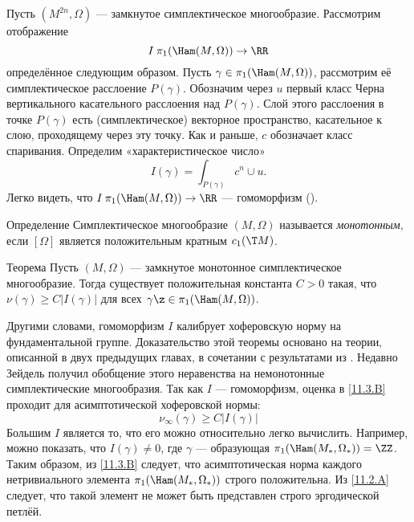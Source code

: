 Пусть $(M^{2n},\Omega)$ --- замкнутое симплектическое многообразие.
Рассмотрим отображение
\[I\:\pi_1(\Ham(M,\Omega))\to\RR\]
определённое следующим образом.
Пусть $\gamma\in\pi_1(\Ham(M,\Omega))$,
рассмотрим её симплектическое расслоение $P(\gamma)$.
Обозначим через $u$ первый класс Черна вертикального касательного расслоения над $P(\gamma)$.
Слой этого расслоения в точке $P(\gamma)$ есть (симплектическое) векторное пространство, касательное к слою, проходящему через эту точку.
Как и раньше, $c$ обозначает класс спаривания.
Определим «характеристическое число» 
\[I(\gamma)= \int_{P(\gamma)} c^n\cup u.\]
Легко видеть, что $I\: \pi_1(\Ham(M, \Omega))\to \RR$ --- гомоморфизм (\cite{P6,LMP2}).

\begin{ex}{Определение}\label{11.3.A} Симплектическое многообразие $(M,\Omega)$ называется \emph{монотонным}, если $[\Omega]$ является положительным кратным $c_1 (\T M)$.
\end{ex}

\begin{thm}[(\cite{P6})]{Теорема}\label{11.3.B}
Пусть $(M, \Omega)$ --- замкнутое монотонное симплектическое многообразие.
Тогда существует положительная константа $C>0$ такая, что
$\nu(\gamma)\ge C|I(\gamma)|$ для всех $\gamma\z\in\pi_1(\Ham(M,\Omega))$.
\end{thm}

Другими словами, гомоморфизм $I$ калибрует хоферовскую норму на фундаментальной группе.
Доказательство этой теоремы основано на теории, описанной в двух предыдущих главах, в сочетании с результатами из \cite{Se}.
Недавно Зейдель получил обобщение этого неравенства на немонотонные симплектические многообразия.
Так как $I$ --- гомоморфизм, оценка в \ref{11.3.B} проходит для асимптотической хоферовской нормы: 
\[\nu_\infty(\gamma)\ge C|I(\gamma)|\]
Большим  $I$ является то, что его можно относительно легко вычислить.
Например, можно показать, что $I(\gamma) \ne 0$, где $\gamma$ --- образующая $\pi_1(\Ham(M_\ast,\Omega_\ast)) = \ZZ$.
Таким образом, из \ref{11.3.B} следует, что асимптотическая норма каждого нетривиального элемента $\pi_1(\Ham(M_\ast, \Omega_\ast))$ строго положительна.
Из \ref{11.2.A} следует, что такой элемент не может быть представлен строго эргодической петлёй.
